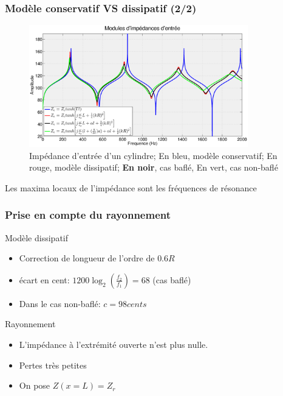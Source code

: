 \begin{frame}
  \frametitle{Modèle conservatif VS dissipatif (2/2)}
    \begin{figure}
      \centering
      \captionsetup{justification=centering, margin=1cm}
      \includegraphics[width=0.85\textwidth]{img/imp_entree3.eps}
      \caption{Impédance d'entrée d'un cylindre;
              {\color{blue} En bleu}, modèle conservatif; 
               \alert{En rouge}, modèle dissipatif;
               {\textbf{En noir}, cas baflé},
               {\color{green}En vert}, cas non-baflé
              }
    \end{figure}
    \begin{center}
      \alert{Les maxima locaux de l'impédance sont les fréquences de résonance}
    \end{center}
\end{frame}

\begin{frame}
  \frametitle{Prise en compte du rayonnement}
  \begin{exampleblock}{Modèle dissipatif}
    \begin{itemize}
    \item Correction de longueur de l'ordre de $0.6 R$
    \item écart en cent: $1200 \log_2 (\frac{f_2}{f_1}) = 68 $ (cas baflé)
    \item Dans le cas non-baflé: $c = 98 cents$
    \end{itemize}

    \end{exampleblock}
\pause
    \begin{block}{Rayonnement}
  \begin{itemize}
    \item L'impédance à l'extrémité ouverte n'est plus nulle.
    \item Pertes très petites
    \item On pose $Z(x = L) = Z_r$
  \end{itemize}
\end{block}
\end{frame}

